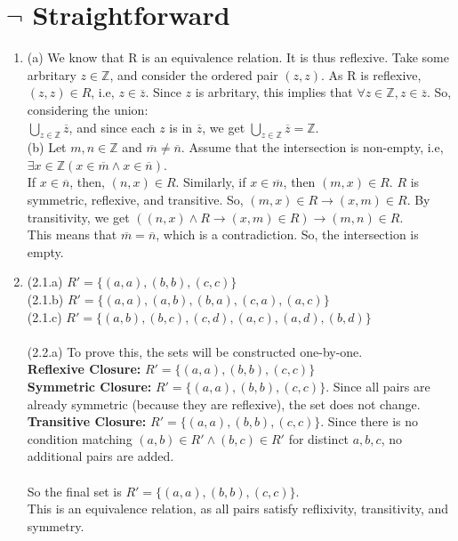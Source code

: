 \documentclass[a4paper]{article}
\begin{document}
\section{$\neg$ Straightforward}
\begin{enumerate}
    \item (a) We know that R is an equivalence relation. It is thus reflexive. Take some arbritary $z \in \mathbb{Z}$, and consider the ordered pair $(z, z)$. As R is reflexive, $(z, z) \in R$, i.e, $z \in \overline{z}$. Since $z$ is arbritary, this implies that $\forall z \in \mathbb{Z}, z \in \overline{z}$. So, considering the union:\\
    
    $\bigcup_{z \in \mathbb{Z}} \overline{z}$, and since each $z$ is in $\overline{z}$, we get $\bigcup_{z \in \mathbb{Z}} \overline{z} = \mathbb{Z}$.\\

(b) Let $m, n \in \mathbb{Z}$ and $\overline{m} \neq \overline{n}$. Assume that the intersection is non-empty, i.e, $\exists x \in \mathbb{Z} (x \in \overline{m} \land x \in \overline{n})$.\\
If $x \in \overline{n}$, then, $(n, x) \in R$. Similarly, if $x \in \overline{m}$, then $(m, x) \in R$. $R$ is symmetric, reflexive, and transitive. So, $(m, x) \in R \rightarrow (x, m) \in R$. By transitivity, we get $((n, x) \land R \rightarrow (x, m) \in R) \rightarrow (m, n) \in R$.\\

This means that $\overline{m} = \overline{n}$, which is a contradiction. So, the intersection is empty.\\
    

\item
(2.1.a) $R' = \{(a, a), (b, b), (c, c)\}$\\
(2.1.b) $R' = \{(a, a), (a, b), (b, a), (c, a), (a, c)\}$\\
(2.1.c) $R' = \{(a, b), (b, c), (c, d), (a, c), (a, d), (b, d)\}$\\
\\
(2.2.a) To prove this, the sets will be constructed one-by-one.\\
\textbf{Reflexive Closure:} $R' = \{(a, a), (b, b), (c, c)\}$\\
\textbf{Symmetric Closure:} $R' = \{(a, a), (b, b), (c, c)\}$. Since all pairs are already symmetric (because they are reflexive), the set does not change.\\
\textbf{Transitive Closure:} $R' = \{(a, a), (b, b), (c, c)\}$. Since there is no condition matching $(a, b) \in R' \land (b, c) \in R'$ for distinct $a, b, c$, no additional pairs are added.\\
\\
So the final set is $R' = \{(a, a), (b, b), (c, c)\}$.\\
This is an equivalence relation, as all pairs satisfy reflixivity, transitivity, and symmetry.\\


\end{enumerate}
\end{document}
